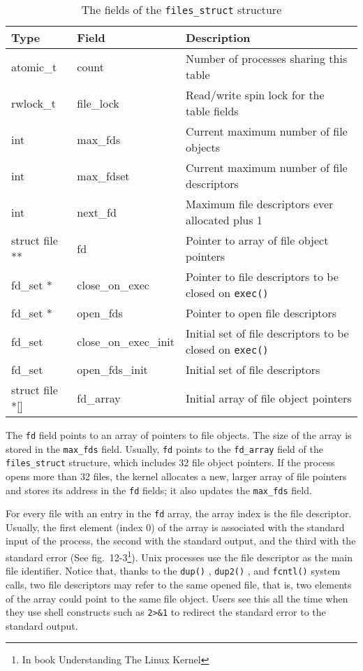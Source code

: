 \begin{table}[!h]
  \centering
  \caption{The fields of the \texttt{files\_struct} structure}
  \label{tbl:filestruct}%
  \begin{tabularx}{\textwidth}{>{\ttfamily}l>{\ttfamily}lX}
    \toprule
    \textbf{Type}   &\textbf{Field}&\textbf{Description}\\\midrule
    atomic\_t       &count&Number of processes sharing this table\\
    rwlock\_t       &file\_lock&Read/write spin lock for the table fields\\
    int             &max\_fds&Current maximum number of file objects\\
    int             &max\_fdset&Current maximum number of file descriptors\\
    int             &next\_fd&Maximum file descriptors ever allocated plus 1\\
    struct file **  &fd&Pointer to array of file object pointers\\
    fd\_set *       &close\_on\_exec&Pointer to file descriptors to be closed on \texttt{exec()}\\
    fd\_set *       &open\_fds&Pointer to open file descriptors\\
    fd\_set         &close\_on\_exec\_init&Initial set of file descriptors to be closed on \texttt{exec()}\\
    fd\_set         &open\_fds\_init&Initial set of file descriptors\\
    struct file *[] &fd\_array&Initial array of file object pointers\\\bottomrule
  \end{tabularx}
\end{table}
  
The \texttt{fd} field points to an array of pointers to file objects. The size of the
array is stored in the \texttt{max\_fds} field. Usually, \texttt{fd} points to the
\texttt{fd\_array} field of the \texttt{files\_struct} structure, which includes 32 file
object pointers. If the process opens more than 32 files, the kernel allocates a new,
larger array of file pointers and stores its address in the \texttt{fd} fields; it also
updates the \texttt{max\_fds} field.

For every file with an entry in the \texttt{fd} array, the array index is the file
descriptor. Usually, the first element (index 0) of the array is associated with the
standard input of the process, the second with the standard output, and the third with the
standard error (See fig.~12-3\footnote{In book Understanding The Linux Kernel}). Unix
processes use the file descriptor as the main file identifier. Notice that, thanks to the
\verb|dup()| , \verb|dup2()| , and \verb|fcntl()| system calls, two file descriptors may
refer to the same opened file, that is, two elements of the array could point to the same
file object. Users see this all the time when they use shell constructs such as
\texttt{2>\&1} to redirect the standard error to the standard output.

